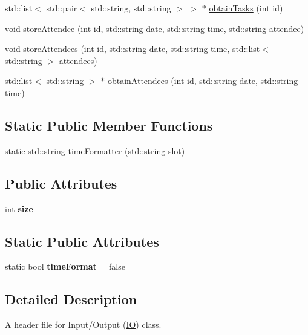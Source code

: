 \begin{DoxyCompactItemize}
\item 
std\+::list$<$ std\+::pair$<$ std\+::string, std\+::string $>$ $>$ $\ast$ \hyperlink{classIO_af2c5dffa84ae0741d41b0a3ccf5990ae}{obtain\+Tasks} (int id)
\item 
void \hyperlink{classIO_ae80862e6964e82c2f2e6d7f3b931f347}{store\+Attendee} (int id, std\+::string date, std\+::string time, std\+::string attendee)
\item 
void \hyperlink{classIO_ae1b8fcfab070b9af2dcd910c1cc7eb4e}{store\+Attendees} (int id, std\+::string date, std\+::string time, std\+::list$<$ std\+::string $>$ attendees)
\item 
std\+::list$<$ std\+::string $>$ $\ast$ \hyperlink{classIO_a6e49698e267ae002df56bde7875107b0}{obtain\+Attendees} (int id, std\+::string date, std\+::string time)
\end{DoxyCompactItemize}
\subsection*{Static Public Member Functions}
\begin{DoxyCompactItemize}
\item 
static std\+::string \hyperlink{classIO_ad78c42847c70915fe94bddd25f716859}{time\+Formatter} (std\+::string slot)
\end{DoxyCompactItemize}
\subsection*{Public Attributes}
\begin{DoxyCompactItemize}
\item 
\mbox{\label{classIO_a4e344c74454e6609b817e3fdb3fcddf3}} 
int {\bfseries size}
\end{DoxyCompactItemize}
\subsection*{Static Public Attributes}
\begin{DoxyCompactItemize}
\item 
\mbox{\label{classIO_a04cf024687a6a86007db5ecfcab69e5c}} 
static bool {\bfseries time\+Format} = false
\end{DoxyCompactItemize}


\subsection{Detailed Description}
A header file for Input/\+Output (\hyperlink{classIO}{IO}) class. 

